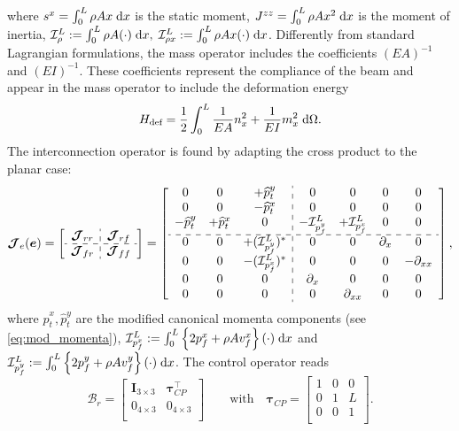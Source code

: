 \documentclass{svjour3}                     %
\newcommand{\firstRev}[1]{\textcolor{red!80!black}{#1}}
\begin{document}
	where  $s^x = \int_{0}^{L} \rho A x \d{x}$ is the static moment, $J^{zz} = \int_{0}^{L} \rho A x^2 \d{x}$ is the moment of inertia, $\mathcal{I}_\rho^L := \int_{0}^L \rho A (\cdot) \d{x}, \; \mathcal{I}_{\rho x}^L := \int_{0}^L \rho A x (\cdot) \d{x}$. \firstRev{Differently from standard Lagrangian formulations, the mass operator includes the coefficients $(EA)^{-1}$ and $(EI)^{-1}$. These coefficients represent the compliance of the beam and appear in the mass operator to include the deformation energy
		\begin{equation*}
		H_{\text{def}} = \frac{1}{2}\int_{0}^L \frac{1}{EA} n_x^2 + \frac{1}{EI} m_x^2  \d\Omega.
		\end{equation*}
	} The interconnection operator is found by adapting the cross product to the planar case:
	\begin{equation}
	\label{eq:EB_J}
	\bm{\mathcal{J}}_{e}(\bm{e}) = 
	\left[ \begin{array}{c:c}
	\bm{\mathcal{J}}_{rr} & \bm{\mathcal{J}}_{rf} \\
	\hdashline
	\bm{\mathcal{J}}_{fr} & \bm{\mathcal{J}}_{ff} \\
	\end{array} \right] = 
	\left[ \begin{array}{ccc:cccc}
	0 & 0 & +\widehat{p}_t^y      & 0 & 0 & 0 & 0 \\
	0 & 0 & -\widehat{p}_t^x     & 0 & 0 & 0 & 0 \\
	-\widehat{p}_t^y & +\widehat{p}_t^x & 0 & -\mathcal{I}_{p_f^y}^{L} & +\mathcal{I}_{p_f^x}^{L} & 0 & 0 \\
	\hdashline 
	0 & 0 & +(\mathcal{I}_{p_f^y}^{L})^* & 0 & 0 & \partial_x & 0  \\
	0 & 0 & -(\mathcal{I}_{p_f^x}^{L})^* & 0 & 0 & 0 & -\partial_{xx} \\
	0 & 0 & 0 & \partial_{x} & 0 & 0 & 0 \\
	0 & 0 & 0 & 0 & \partial_{xx} & 0 & 0 \\
	\end{array} \right],
	\end{equation}
	where $\widehat{p}_t^x, \widehat{p}_t^y$ are the modified canonical momenta components (see \eqref{eq:mod_momenta}), $\mathcal{I}_{p_f^x}^{L} := \int_{0}^{L} \left\{2 p_f^x + \rho A v_f^x \right\} (\cdot) \d{x}$ and $\mathcal{I}_{p_f^y}^{L} := \int_{0}^{L} \left\{2 p_f^y + \rho A v_f^y \right\} (\cdot) \d{x}$. The control operator reads
	\begin{equation}
	\bm{\mathcal{B}}_r = \begin{bmatrix}
	\bm{I}_{3\times 3} & \bm\tau_{CP}^\top \\
	0_{4\times 3} & 0_{4\times 3} \\
	\end{bmatrix} \qquad \text{with} \quad
	\bm\tau_{CP} = \begin{bmatrix}
	1 & 0 & 0 \\
	0 & 1 & L \\
	0 & 0 & 1 \\
	\end{bmatrix}.
	\end{equation}
	
\end{document}
